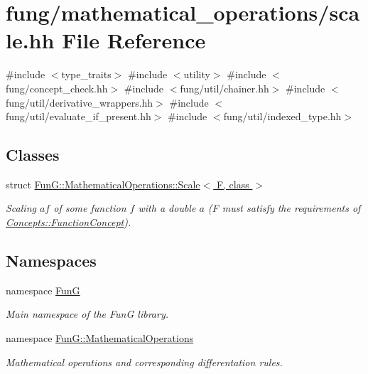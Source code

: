 \hypertarget{scale_8hh}{\section{fung/mathematical\-\_\-operations/scale.hh \-File \-Reference}
\label{scale_8hh}
}
{\ttfamily \#include $<$type\-\_\-traits$>$}\*
{\ttfamily \#include $<$utility$>$}\*
{\ttfamily \#include $<$fung/concept\-\_\-check.\-hh$>$}\*
{\ttfamily \#include $<$fung/util/chainer.\-hh$>$}\*
{\ttfamily \#include $<$fung/util/derivative\-\_\-wrappers.\-hh$>$}\*
{\ttfamily \#include $<$fung/util/evaluate\-\_\-if\-\_\-present.\-hh$>$}\*
{\ttfamily \#include $<$fung/util/indexed\-\_\-type.\-hh$>$}\*
\subsection*{\-Classes}
\begin{DoxyCompactItemize}
\item 
struct \hyperlink{structFunG_1_1MathematicalOperations_1_1Scale}{\-Fun\-G\-::\-Mathematical\-Operations\-::\-Scale$<$ F, class $>$}
\begin{DoxyCompactList}\small\item\em \-Scaling $ af $ of some function $ f $ with a double $ a $ (\-F must satisfy the requirements of \hyperlink{structFunG_1_1Concepts_1_1FunctionConcept}{\-Concepts\-::\-Function\-Concept}). \end{DoxyCompactList}\end{DoxyCompactItemize}
\subsection*{\-Namespaces}
\begin{DoxyCompactItemize}
\item 
namespace \hyperlink{namespaceFunG}{\-Fun\-G}
\begin{DoxyCompactList}\small\item\em \-Main namespace of the \-Fun\-G library. \end{DoxyCompactList}\item 
namespace \hyperlink{namespaceFunG_1_1MathematicalOperations}{\-Fun\-G\-::\-Mathematical\-Operations}
\begin{DoxyCompactList}\small\item\em \-Mathematical operations and corresponding differentation rules. \end{DoxyCompactList}\end{DoxyCompactItemize}
